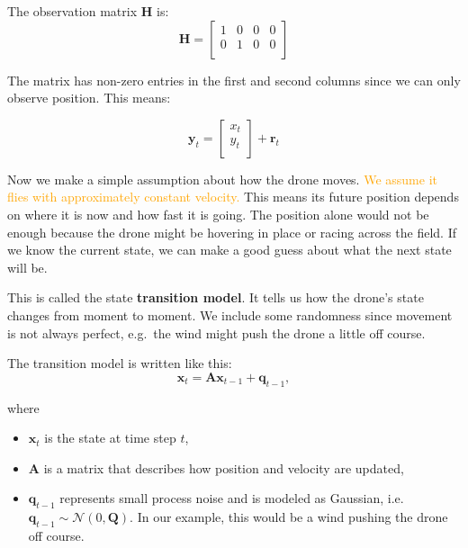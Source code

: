 \begin{example}
The observation matrix \textbf{H} is: 
\[\mathbf{H} = \begin{bmatrix}
   1 & 0 & 0 & 0\\
   0 & 1 & 0 & 0\\   
\end{bmatrix}\]

The matrix has non-zero entries in the first and second columns since we can only observe position. This means: 

\[\mathbf{y}_t = \begin{bmatrix}
   x_t \\
   y_t \\ 
\end{bmatrix} + \textbf{r}_t\]


\medskip 
Now we make a simple assumption about how the drone moves. %
\textcolor{orange}{We assume it flies with approximately constant velocity.} This means its future position depends on where it is now and how fast it is going. The position alone would not be enough because the drone might be hovering in place or racing across the field. If we know the current state, we can make a good guess about what the next state will be. 

This is called the state \textbf{transition model}. It tells us how the drone's state changes from moment to moment. We include some randomness since movement is not always perfect, e.g.~the wind might push the drone a little off course. 

The transition model is written like this: 
\begin{equation}\label{eq: transition model}
\textbf{x}_t = \textbf{A}\textbf{x}_{t-1}+\textbf{q}_{t-1},   
\end{equation}

where 
\begin{itemize}
    \item $\textbf{x}_t$ is the state at time step $t$,
    \item $\textbf{A}$ is a matrix that describes how position and velocity are updated, 
    \item $\mathbf{q}_{t-1}$ represents small process noise and is modeled as Gaussian, i.e. $\mathbf{q}_{t-1} \sim \mathcal{N}(0, \mathbf{Q})$. In our example, this would be a wind pushing the drone off course. 
\end{itemize}


\end{example}

